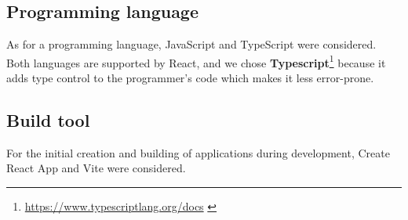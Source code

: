 \subsection*{Programming language}
As for a programming language, JavaScript and TypeScript were considered.
Both languages are supported by React, and we chose \textbf{Typescript}\footnote{\url{https://www.typescriptlang.org/docs}  \label{fnlabel}} because it adds type control to the programmer's code which makes it less error-prone.

\subsection*{Build tool}
For the initial creation and building of applications during development, Create React App and Vite were considered.
